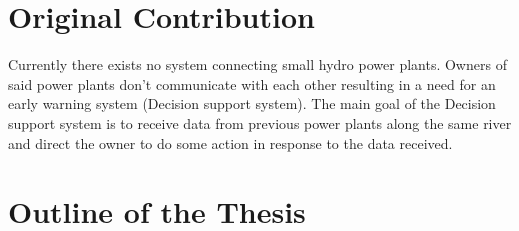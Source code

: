 \section{Original Contribution}
\label{sec:OriginalContribution}
\indent Currently there exists no system connecting small hydro power plants. Owners of said power plants don't communicate with each other resulting in a need for an early warning system (Decision support system). The main goal of the Decision support system is to receive data from previous power plants along the same river and direct the owner to do some action in response to the data received.\\
\section{Outline of the Thesis}
\label{sec:OutlineOfTheThesis}
